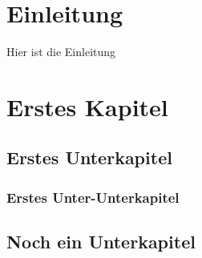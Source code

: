 \section{Einleitung}
Hier ist die Einleitung
\lipsum

\pagebreak

\section{Erstes Kapitel}
\lipsum

\subsection{Erstes Unterkapitel}
\lipsum
\subsubsection{Erstes Unter-Unterkapitel}
\lipsum

\subsection{Noch ein Unterkapitel}